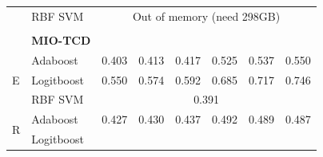 \documentclass[12pt]{article}
\begin{document}
\begin{sloppypar}
\begin{table}[hbt!]
\begin{tabular}{lllllllll}
                                       & \multicolumn{2}{l}{RBF SVM}              & \multicolumn{6}{c}{Out of memory (need 298GB)}                                                                                                                                                                \\
\multicolumn{9}{l}{}                                                                                                                                                                                                                                                                              \\
                                       & \multicolumn{2}{l}{\textbf{MIO-TCD}}     & \multicolumn{6}{l}{}                                                                                                                                                                                          \\
\multirow{3}{*}{E}                     & \multicolumn{2}{l}{Adaboost}             & 0.403                           & 0.413                            & 0.417                            & 0.525                           & 0.537                            & 0.550                            \\
                                       & \multicolumn{2}{l}{Logitboost}           & 0.550                           & 0.574                            & 0.592                            & 0.685                           & 0.717                            & 0.746                            \\
                                       & \multicolumn{2}{l}{RBF SVM}              & \multicolumn{6}{c}{0.391}                                                                                                                                                                                     \\
\multirow{3}{*}{R}                     & \multicolumn{2}{l}{Adaboost}             & 0.427                           & 0.430                            & 0.437                            & 0.492                           & 0.489                            & 0.487                            \\
                                       & \multicolumn{2}{l}{Logitboost}           &                                 &                                  &                                  &                                 &                                  &                                  \\

\end{tabular}
\end{table}
\end{sloppypar}
\end{document}
